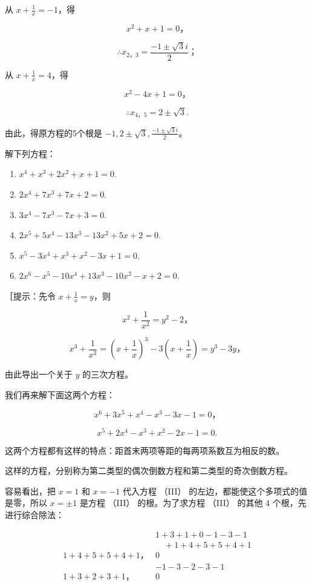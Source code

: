 从 \(x + \frac{1}{x} = -1\)，得

\[
x ^ {2} + x + 1 = 0\text{，}
\]

\[
\therefore x _ {2\text{，} 3} = \frac {- 1 \pm \sqrt {3} i}{2}\text{；}
\]

从 \(x + \frac{1}{x} = 4\)，得

\[
x ^ {2} - 4 x + 1 = 0\text{，}
\]

\[
\therefore x _ {4\text{，} 5} = 2 \pm \sqrt {3}.
\]

由此，得原方程的5个根是
\(-1, 2 \pm \sqrt{3}, \frac{-1 \pm \sqrt{3} i}{2}\)。

解下列方程：

\begin{enumerate}
\item
  \(x^{4} + x^{3} + 2x^{2} + x + 1 = 0.\)
\item
  \(2x^{4} + 7x^{3} + 7x + 2 = 0.\)
\item
  \(3x^{4} - 7x^{3} - 7x + 3 = 0.\)
\item
  \(2x^{5} + 5x^{4} - 13x^{3} - 13x^{2} + 5x + 2 = 0.\)
\item
  \(x^{5} - 3x^{4} + x^{3} + x^{2} - 3x + 1 = 0.\)
\item
  \(2x^{6} - x^{5} - 10x^{4} + 13x^{3} - 10x^{2} - x + 2 = 0.\)
\end{enumerate}

［提示：先令 \(x + \frac{1}{x} = y\)，则

\[
x ^ {2} + \frac {1}{x ^ {2}} = y ^ {2} - 2\text{，}
\]

\[
x ^ {3} + \frac {1}{x ^ {3}} = \left(x + \frac {1}{x}\right) ^ {3} - 3 \left(x + \frac {1}{x}\right) = y ^ {3} - 3 y\text{，}
\]

由此导出一个关于 \(y\) 的三次方程。

我们再来解下面这两个方程：

\[
x ^ {6} + 3 x ^ {5} + x ^ {4} - x ^ {3} - 3 x - 1 = 0\text{，} \tag {III}
\]

\[
x ^ {5} + 2 x ^ {4} - x ^ {3} + x ^ {2} - 2 x - 1 = 0. \tag {IV}
\]

这两个方程都有这样的特点：距首末两项等距的每两项系数互为相反的数。

这样的方程，分别称为第二类型的偶次倒数方程和第二类型的奇次倒数方程。

容易看出，把 \(x = 1\) 和 \(x = -1\) 代入方程 （III）
的左边，都能使这个多项式的值是零，所以 \(x = \pm 1\) 是方程 （III）
的根。为了求方程 （III） 的其他 4 个根，先进行综合除法：

\[
\begin{array}{rl} & 1 + 3 + 1 + 0 - 1 - 3 - 1 \\ & \quad + 1 + 4 + 5 + 5 + 4 + 1 \\ \hline 1 + 4 + 5 + 5 + 4 + 1\text{，} & 0 \\ & - 1 - 3 - 2 - 3 - 1 \\ \hline 1 + 3 + 2 + 3 + 1\text{，} & 0 \end{array}
\]

